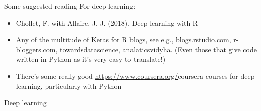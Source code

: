 \documentclass{beamer}
\begin{document}
\begin{frame}{Some suggested reading}
For deep learning:
\begin{itemize}
\item Chollet, F. with Allaire, J. J. (2018). Deep learning with R 
\item Any of the multitude of Keras for R blogs, see e.g., \href{https://blogs.rstudio.com/ai/posts/2019-11-27-gettingstarted-2020/}{blogs.rstudio.com}, \href{https://www.r-bloggers.com/2021/12/using-keras-for-deep-learning-with-r/}{r-bloggers.com}, \href{https://towardsdatascience.com/r-vs-python-image-classification-with-keras-1fa99a8fef9b}{towardsdatascience}, \href{https://www.analyticsvidhya.com/blog/2017/06/getting-started-with-deep-learning-using-keras-in-r/}{analaticsvidyha}. (Even those that give code written in Python as it's very easy to translate!)
\item There's some really good \url{https://www.coursera.org/}{coursera} courses for deep learning, particularly with Python
\end{itemize}
\end{frame}

\begin{frame}
\begin{center}
\Huge Deep learning
\end{center}
\end{frame}
\end{document}
